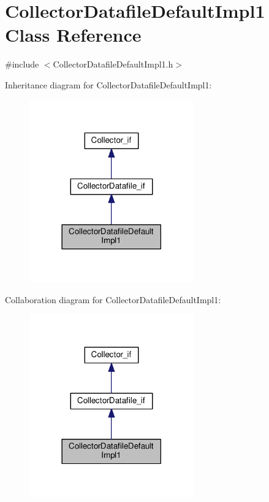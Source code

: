\hypertarget{class_collector_datafile_default_impl1}{}\section{Collector\+Datafile\+Default\+Impl1 Class Reference}
\label{class_collector_datafile_default_impl1}


{\ttfamily \#include $<$Collector\+Datafile\+Default\+Impl1.\+h$>$}



Inheritance diagram for Collector\+Datafile\+Default\+Impl1\+:\nopagebreak
\begin{figure}[H]
\begin{center}
\leavevmode
\includegraphics[width=201pt]{class_collector_datafile_default_impl1__inherit__graph}
\end{center}
\end{figure}


Collaboration diagram for Collector\+Datafile\+Default\+Impl1\+:\nopagebreak
\begin{figure}[H]
\begin{center}
\leavevmode
\includegraphics[width=201pt]{class_collector_datafile_default_impl1__coll__graph}
\end{center}
\end{figure}
